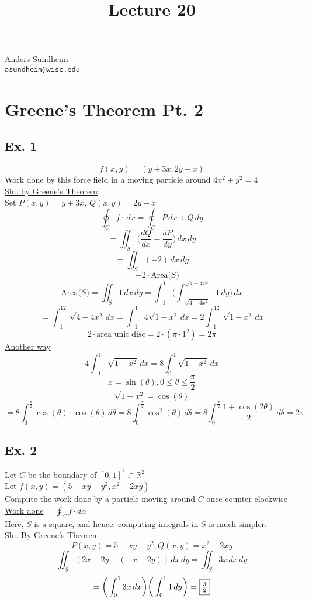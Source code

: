 \documentclass[12pt]{article}
\title{Lecture 20}
\newcommand{\BR}{\mathbb R}
\begin{document}
\maketitle
\vspace*{-0.25in}
\begin{center}
	Anders Sundheim \\
	\href{mailto:asundheim@wisc.edu}{{\tt asundheim@wisc.edu}}
\end{center}
\section*{Greene's Theorem Pt. 2}
    \subsection*{Ex. 1}
        \[ f(x,y)=(y+3x,2y-x) \]
        Work done by this force field in a moving particle around $4x^2+y^2=4$ \\
        \underline{Sln. by Greene's Theorem}: \\
        Set $P(x,y)=y+3x$, $Q(x,y)=2y-x$ \\
        \[ \oint_Cf\cdot\,dx=\oint_CP\,dx+Q\,dy \]
        \[ = \iint_S\big(\frac{dQ}{dx}-\frac{dP}{dy}\big)\,dx\,dy \]
        \[ = \iint_S(-2)\,dx\,dy \]
        \[ = -2\cdot\text{Area($S$)} \]
        \[ \text{Area($S$)}=\iint_S 1\,dx\,dy=\int_{-1}^1\bigg(\int_{-\sqrt{4-4x^2}}^{\sqrt{4-4x^2}}1\,dy\bigg)\,dx \]
        \[ = \int_{-1}^12\sqrt{4-4x^2}\,dx = \int_{-1}^1 4\sqrt{1-x^2}\,dx=2\int_{-1}^12\sqrt{1-x^2}\,dx \]
        \[ 2\cdot\text{area unit disc}=2\cdot(\pi\cdot 1^2)=2\pi \]
        \underline{Another way} \\
        \[ 4\int_{-1}^1\sqrt{1-x^2}\,dx=8\int_0^1\sqrt{1-x^2}\,dx \]
        \[ x=\sin(\theta), 0\leq\theta\leq\frac{\pi}{2} \]
        \[ \sqrt{1-x^2}=\cos(\theta) \]
        \[ = 8\int_0^{\frac{\pi}{2}}\cos(\theta)\cdot\cos(\theta)\,d\theta=8\int_0^{\frac{\pi}{2}}\cos^2(\theta)\,d\theta=8\int_0^{\frac{\pi}{2}}\frac{1+\cos(2\theta)}{2}\,d\theta = 2\pi \]
    \subsection*{Ex. 2}
        Let $C$ be the boundary of $[0,1]^2\subset\BR^2$ \\
        Let $f(x,y)=(5-xy-y^2,x^2-2xy)$ \\
        Compute the work done by a particle moving around $C$ once counter-clockwise \\
        \underline{Work done} = $\oint_Cf\cdot d\alpha$ \\
        Here, $S$ is a square, and hence, computing integrals in $S$ is much simpler. \\
        \underline{Sln. By Greene's Theorem}: \\
        \[ P(x,y)=5-xy-y^2, Q(x,y)=x^2-2xy \]
        \[ \iint_S(2x-2y-(-x-2y))\,dx\,dy = \iint_S3x\,dx\,dy \]
        \[ = \bigg(\int_0^1 3x\,dx\bigg)\bigg(\int_0^1 1\,dy\bigg)=\fbox{$\frac{3}{2}$} \]
\end{document}
